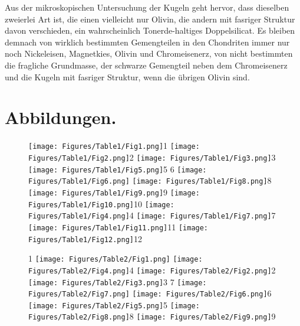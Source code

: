 \documentclass[a4paper, 11pt, oneside]{article}
\begin{document}
Aus der mikroskopischen Untersuchung der Kugeln geht hervor, dass dieselben zweierlei Art ist, die einen vielleicht nur Olivin, die andern mit fasriger Struktur davon verschieden, ein wahrscheinlich Tonerde-haltiges Doppelsilicat. Es bleiben demnach von wirklich bestimmten Gemengteilen in den Chondriten immer nur noch Nickeleisen, Magnetkies, Olivin und Chromeisenerz, von nicht bestimmten die fragliche Grundmasse, der schwarze Gemengteil neben dem Chromeisenerz und die Kugeln mit fasriger Struktur, wenn die übrigen Olivin sind.
\clearpage
\section{Abbildungen.}
\clearpage
\setlength\intextsep{0pt}
\pagestyle{fancy}
\fancyhf{}
\cfoot{\thepage}
\begin{figure}[p]
\texttt{[image: Figures/Table1/Fig1.png]}\tiny 1
\texttt{[image: Figures/Table1/Fig2.png]}\tiny 2
\texttt{[image: Figures/Table1/Fig3.png]}\tiny 3
\texttt{[image: Figures/Table1/Fig5.png]}\tiny 5
\tiny   6
\texttt{[image: Figures/Table1/Fig6.png]}
\texttt{[image: Figures/Table1/Fig8.png]}\tiny 8
\texttt{[image: Figures/Table1/Fig9.png]}\tiny 9
\texttt{[image: Figures/Table1/Fig10.png]}\tiny 10
\texttt{[image: Figures/Table1/Fig4.png]}\tiny 4
\texttt{[image: Figures/Table1/Fig7.png]}\tiny 7
\texttt{[image: Figures/Table1/Fig11.png]}\tiny 11
\texttt{[image: Figures/Table1/Fig12.png]}\tiny 12
\end{figure}
\clearpage
{}
\cfoot{\thepage}
\begin{figure}[p]
\tiny 1
\texttt{[image: Figures/Table2/Fig1.png]}
\texttt{[image: Figures/Table2/Fig4.png]}\tiny 4
\texttt{[image: Figures/Table2/Fig2.png]}\tiny 2
\texttt{[image: Figures/Table2/Fig3.png]}\tiny 3
\tiny 7
\texttt{[image: Figures/Table2/Fig7.png]}
\texttt{[image: Figures/Table2/Fig6.png]}\tiny 6
\texttt{[image: Figures/Table2/Fig5.png]}\tiny 5
\texttt{[image: Figures/Table2/Fig8.png]}\tiny 8
\texttt{[image: Figures/Table2/Fig9.png]}\tiny 9
\end{figure}
\end{document}
